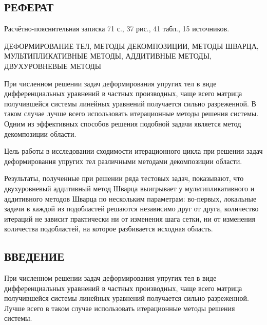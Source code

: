 \documentclass[a4paper, 14pt]{extarticle}
\begin{document}
\newpage

\begin{center}
\section*{\centering РЕФЕРАТ}
\end{center}
\setcounter{page}{2}

Расчётно-пояснительная записка 71 с., 37 рис., 41 табл., 15 источников.

ДЕФОРМИРОВАНИЕ ТЕЛ, МЕТОДЫ ДЕКОМПОЗИЦИИ, МЕТОДЫ ШВАРЦА, МУЛЬТИПЛИКАТИВНЫЕ МЕТОДЫ, АДДИТИВНЫЕ МЕТОДЫ, ДВУХУРОВНЕВЫЕ МЕТОДЫ

При численном решении задач деформирования упругих тел в виде дифференциальных уравнений в частных производных, чаще всего матрица получившейся системы линейных уравнений получается сильно разреженной. В таком случае лучше всего использовать итерационные методы решения системы. Одним из эффективных способов решения подобной задачи является метод декомпозиции области.

Цель работы в исследовании сходимости итерационного цикла при решении задач деформирования упругих тел различными методами декомпозиции области.

Результаты, полученные при решении ряда тестовых задач, показывают, что двухуровневый аддитивный метод Шварца выигрывает у мультипликативного и аддитивного методов Шварца по нескольким параметрам: во-первых, локальные задачи в каждой из подобластей решаются независимо друг от друга, количество итераций не зависит практически ни от изменения шага сетки, ни от изменения количества подобластей, на которое разбивается исходная область.

\newpage

\renewcommand*\contentsname{\begin{center}СОДЕРЖАНИЕ\end{center}}
	
\tableofcontents

\newpage

\begin{center}
\section*{\centering ВВЕДЕНИЕ}
\end{center}

При численном решении задач деформирования упругих тел в виде дифференциальных уравнений в частных производных, чаще всего матрица получившейся системы линейных уравнений получается сильно разреженной. Лучше всего в таком случае использовать итерационные методы решения системы. 
\end{document}
